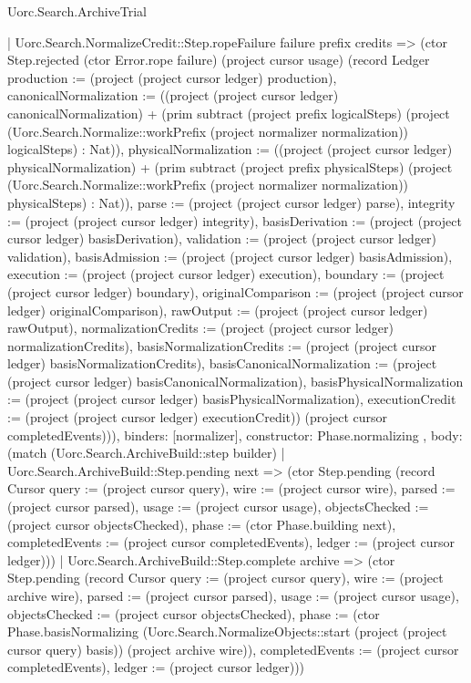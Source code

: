 \begin{lexlean}{Uorc.Search.ArchiveTrial}
\begin{semanticmodule}
{{{          | Uorc.Search.NormalizeCredit::Step.ropeFailure failure prefix credits => (ctor Step.rejected (ctor Error.rope failure) (project cursor usage) (record Ledger {production := (project (project cursor ledger) production), canonicalNormalization := ((project (project cursor ledger) canonicalNormalization) + (prim subtract (project prefix logicalSteps) (project (Uorc.Search.Normalize::workPrefix (project normalizer normalization)) logicalSteps) : Nat)), physicalNormalization := ((project (project cursor ledger) physicalNormalization) + (prim subtract (project prefix physicalSteps) (project (Uorc.Search.Normalize::workPrefix (project normalizer normalization)) physicalSteps) : Nat)), parse := (project (project cursor ledger) parse), integrity := (project (project cursor ledger) integrity), basisDerivation := (project (project cursor ledger) basisDerivation), validation := (project (project cursor ledger) validation), basisAdmission := (project (project cursor ledger) basisAdmission), execution := (project (project cursor ledger) execution), boundary := (project (project cursor ledger) boundary), originalComparison := (project (project cursor ledger) originalComparison), rawOutput := (project (project cursor ledger) rawOutput), normalizationCredits := (project (project cursor ledger) normalizationCredits), basisNormalizationCredits := (project (project cursor ledger) basisNormalizationCredits), basisCanonicalNormalization := (project (project cursor ledger) basisCanonicalNormalization), basisPhysicalNormalization := (project (project cursor ledger) basisPhysicalNormalization), executionCredit := (project (project cursor ledger) executionCredit)}) (project cursor completedEvents))),
        binders: [normalizer],
        constructor: Phase.normalizing
      },
      {
        body: (match (Uorc.Search.ArchiveBuild::step builder)
          | Uorc.Search.ArchiveBuild::Step.pending next => (ctor Step.pending (record Cursor {query := (project cursor query), wire := (project cursor wire), parsed := (project cursor parsed), usage := (project cursor usage), objectsChecked := (project cursor objectsChecked), phase := (ctor Phase.building next), completedEvents := (project cursor completedEvents), ledger := (project cursor ledger)}))
          | Uorc.Search.ArchiveBuild::Step.complete archive => (ctor Step.pending (record Cursor {query := (project cursor query), wire := (project archive wire), parsed := (project cursor parsed), usage := (project cursor usage), objectsChecked := (project cursor objectsChecked), phase := (ctor Phase.basisNormalizing (Uorc.Search.NormalizeObjects::start (project (project cursor query) basis)) (project archive wire)), completedEvents := (project cursor completedEvents), ledger := (project cursor ledger)}))
}}}
\end{semanticmodule}
\end{lexlean}
